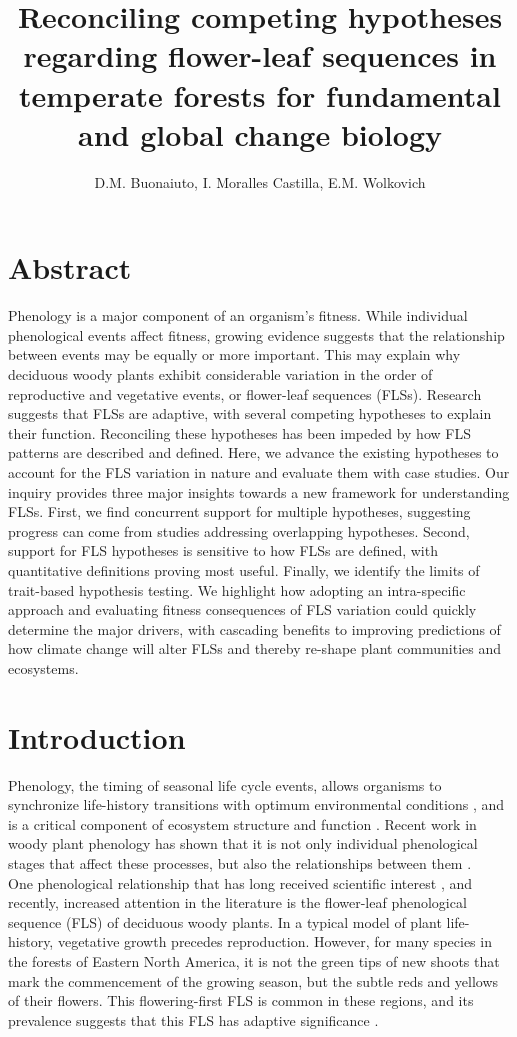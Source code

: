 \documentclass{article}
\title{Reconciling competing hypotheses regarding flower-leaf sequences in temperate forests for fundamental and global change biology}
\author{D.M. Buonaiuto, I. Moralles Castilla, E.M. Wolkovich}
\begin{document}
\maketitle
\section*{Abstract}
Phenology is a major component of an organism's fitness. While individual phenological events affect fitness, growing evidence suggests that the relationship between events may be equally or more important. This may explain why deciduous woody plants exhibit considerable variation in the order of reproductive and vegetative events, or flower-leaf sequences (FLSs). Research suggests that FLSs are adaptive, with several competing hypotheses to explain their function. Reconciling these hypotheses has been impeded by how FLS patterns are described and defined. Here, we advance the existing hypotheses to account for the FLS variation in nature and evaluate them with case studies. Our inquiry provides three major insights towards a new framework for understanding FLSs. First, we find concurrent support for multiple hypotheses, suggesting progress can come from studies addressing overlapping hypotheses. Second, support for FLS hypotheses is sensitive to how FLSs are defined, with quantitative definitions proving most useful. Finally, we identify the limits of trait-based hypothesis testing. We highlight how adopting an intra-specific approach and evaluating fitness consequences of FLS variation could quickly determine the major drivers, with cascading benefits to improving predictions of how climate change will alter FLSs and thereby re-shape plant communities and ecosystems.

\section*{Introduction}
Phenology, the timing of seasonal life cycle events, allows organisms to synchronize life-history transitions with optimum environmental conditions \citep{Forrest2010}, and is a critical component of ecosystem structure and function \citep{Cleland2007,Piao2007}. Recent work in woody plant phenology has shown that it is not only individual phenological stages that affect these processes, but also the relationships between them \citep{Ettinger2018}.\\

\noindent One phenological relationship that has long received scientific interest \citep[see][]{Robertson1895}, and recently, increased attention in the literature \citep{Savage2019, Gougherty2018} is the flower-leaf phenological sequence (FLS) of deciduous woody plants. In a typical model of plant life-history, vegetative growth precedes reproduction. However, for many species in the forests of Eastern North America, it is not the green tips of new shoots that mark the commencement of the growing season, but the subtle reds and yellows of their flowers. This flowering-first FLS is common in these regions, and its prevalence suggests that this FLS has adaptive significance \citep{Rathcke_1985}.\\ 
\end{document}
